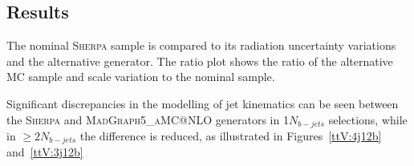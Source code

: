 



\subsection{Results}

The nominal  \textsc{Sherpa} \ttW  sample is compared to its radiation uncertainty variations and the alternative generator.
The ratio plot shows the ratio of the alternative MC sample and scale variation to the nominal sample.%

Significant discrepancies in the modelling of jet kinematics can be seen between the \textsc{Sherpa} \ttW and \textsc{MadGraph5\_aMC@NLO} generators in 1$N_{b-jets}$ selections, while in $\geq2$$N_{b-jets}$ the difference is reduced, as illustrated in Figures~\ref{ttV:4j12b} and~\ref{ttV:3j12b}


